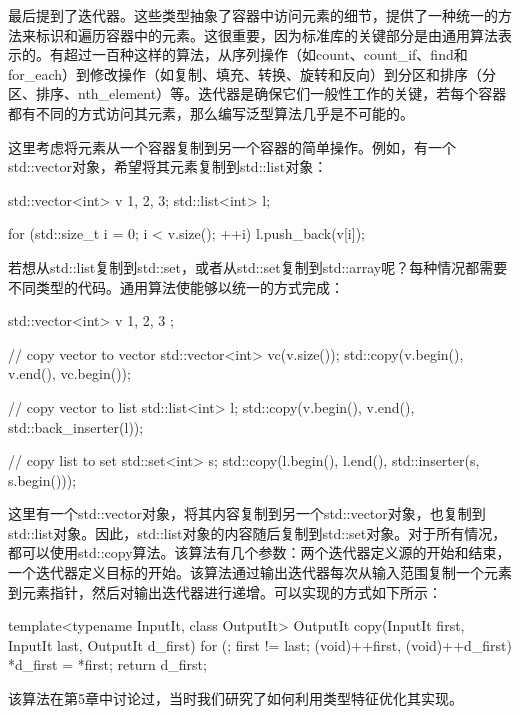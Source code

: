 最后提到了迭代器。这些类型抽象了容器中访问元素的细节，提供了一种统一的方法来标识和遍历容器中的元素。这很重要，因为标准库的关键部分是由通用算法表示的。有超过一百种这样的算法，从序列操作（如count、count\_if、find和for\_each）到修改操作（如复制、填充、转换、旋转和反向）到分区和排序（分区、排序、nth\_element）等。迭代器是确保它们一般性工作的关键，若每个容器都有不同的方式访问其元素，那么编写泛型算法几乎是不可能的。

这里考虑将元素从一个容器复制到另一个容器的简单操作。例如，有一个std::vector对象，希望将其元素复制到std::list对象：

\begin{cpp}
std::vector<int> v {1, 2, 3};
std::list<int> l;

for (std::size_t i = 0; i < v.size(); ++i)
	l.push_back(v[i]);
\end{cpp}

若想从std::list复制到std::set，或者从std::set复制到std::array呢？每种情况都需要不同类型的代码。通用算法使能够以统一的方式完成：

\begin{cpp}
std::vector<int> v{ 1, 2, 3 };

// copy vector to vector
std::vector<int> vc(v.size());
std::copy(v.begin(), v.end(), vc.begin());

// copy vector to list
std::list<int> l;
std::copy(v.begin(), v.end(), std::back_inserter(l));

// copy list to set
std::set<int> s;
std::copy(l.begin(), l.end(), std::inserter(s, s.begin()));
\end{cpp}

这里有一个std::vector对象，将其内容复制到另一个std::vector对象，也复制到std::list对象。因此，std::list对象的内容随后复制到std::set对象。对于所有情况，都可以使用std::copy算法。该算法有几个参数：两个迭代器定义源的开始和结束，一个迭代器定义目标的开始。该算法通过输出迭代器每次从输入范围复制一个元素到元素指针，然后对输出迭代器进行递增。可以实现的方式如下所示：

\begin{cpp}
template<typename InputIt, class OutputIt>
OutputIt copy(InputIt first, InputIt last,
			  OutputIt d_first)
{
	for (; first != last; (void)++first, (void)++d_first)
	{
		*d_first = *first;
	}
	return d_first;
}
\end{cpp}

\begin{important}
  该算法在第5章中讨论过，当时我们研究了如何利用类型特征优化其实现。
\end{important}

